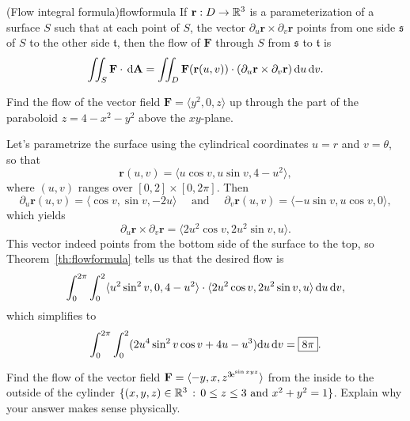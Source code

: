\documentclass[prettycode,shellescape]{watsonbook}
\begin{document}
\begin{theo}{(Flow integral formula)}{flowformula}
  If $\mathbf{r}:D \to \mathbb{R}^3$ is a parameterization of a surface $S$
  such that at each point of $S$, the vector
  $\partial_u \mathbf{r} \times \partial_v \mathbf{r}$ points from one
  side $\mathfrak{s}$ of $S$ to the other side $\mathfrak{t}$, then
  the flow of $\mathbf{F}$ through $S$ from $\mathfrak{s}$ to
  $\mathfrak{t}$ is 
  \begin{equation} \label{eq:surfformula} 
    \iint_S \mathbf{F}\cdot \, {\mathrm{d}}\mathbf{A} = \iint_D
    \mathbf{F}(\mathbf{r}(u,v)) \cdot (\partial_u
    \mathbf{r} \times \partial_v \mathbf{r}) \, {\mathrm{d}}u\,{\mathrm{d}}v. 
  \end{equation}
\end{theo}

\begin{example}{}{}
  Find the flow of the vector field $\mathbf{F} = \langle y^2, 0, z
  \rangle$ up through the part of the paraboloid $z = 4 - x^2 - y^2$
  above the $xy$-plane. 
\end{example}

\begin{solution}
  Let's parametrize the surface using the cylindrical coordinates $u=r$
  and $v=\theta$, so that
  \[
    \mathbf{r}(u,v) = \langle u\cos v, u \sin v, 4 - u^2 \rangle, 
  \]
  where $(u,v)$ ranges over $[0,2] \times [0,2\pi]$. Then 
  \[
    \partial_u \mathbf{r}(u,v) = \langle \cos v, \sin v, -2u \rangle \quad \text{ and } \quad
    \partial_v \mathbf{r}(u,v) = \langle -u\sin v, u \cos v, 0
    \rangle, 
  \]
  which yields 
  \[
    \partial_u\mathbf{r} \times \partial_v \mathbf{r} = \langle 2 u^{2} \cos v,2 u^{2} \sin v, u \rangle. 
  \]
  This vector indeed points from the bottom side of the surface to the
  top, so Theorem~\ref{th:flowformula} tells us that the desired flow
  is 
  \[
    \int_{0}^{2\pi}\int_{0}^{2} \langle u^2 \sin^2 v, 0, 4-u^2
    \rangle \cdot \langle 2 u^{2} \cos v,2 u^{2} \sin v, u \rangle \,
    \mathrm{d} u \, \mathrm{d}{v}, 
  \]
  which simplifies to
  \[
    \int_{0}^{2\pi}\int_{0}^{2} (2 u^4 \sin^2 v \cos v + 4u - u^3)
    \mathrm{d} u \, \mathrm{d}{v} = \boxed{8\pi}. 
  \]
\end{solution}

\begin{exercise}{}{}
  Find the flow of the vector field $\mathbf{F} = \langle -y, x,
  z^{3\hspace{-1pt}\mathrm{e}^{\sin xyz}}\rangle$
  from the inside to the outside of the cylinder $\{(x,y,z) \in \mathbb{R}^3
  \,: \, 0 \leq z \leq 3 \text{ and } x^2 + y^2 = 1\}$. Explain why
  your answer makes sense physically. 
\end{exercise}
\end{document}
